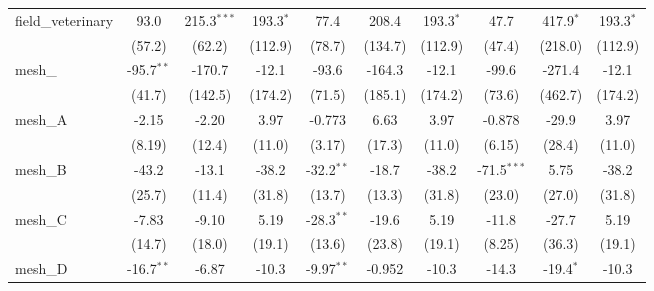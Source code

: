 \begin{tabular}{lccccccccc}
   field\_veterinary                                           & 93.0           & 215.3$^{***}$   & 193.3$^{*}$    & 77.4          & 208.4         & 193.3$^{*}$    & 47.7          & 417.9$^{*}$     & 193.3$^{*}$\\   
                                                               & (57.2)         & (62.2)          & (112.9)        & (78.7)        & (134.7)       & (112.9)        & (47.4)        & (218.0)         & (112.9)\\   
   mesh\_                                                      & -95.7$^{**}$   & -170.7          & -12.1          & -93.6         & -164.3        & -12.1          & -99.6         & -271.4          & -12.1\\   
                                                               & (41.7)         & (142.5)         & (174.2)        & (71.5)        & (185.1)       & (174.2)        & (73.6)        & (462.7)         & (174.2)\\   
   mesh\_A                                                     & -2.15          & -2.20           & 3.97           & -0.773        & 6.63          & 3.97           & -0.878        & -29.9           & 3.97\\   
                                                               & (8.19)         & (12.4)          & (11.0)         & (3.17)        & (17.3)        & (11.0)         & (6.15)        & (28.4)          & (11.0)\\   
   mesh\_B                                                     & -43.2          & -13.1           & -38.2          & -32.2$^{**}$  & -18.7         & -38.2          & -71.5$^{***}$ & 5.75            & -38.2\\   
                                                               & (25.7)         & (11.4)          & (31.8)         & (13.7)        & (13.3)        & (31.8)         & (23.0)        & (27.0)          & (31.8)\\   
   mesh\_C                                                     & -7.83          & -9.10           & 5.19           & -28.3$^{**}$  & -19.6         & 5.19           & -11.8         & -27.7           & 5.19\\   
                                                               & (14.7)         & (18.0)          & (19.1)         & (13.6)        & (23.8)        & (19.1)         & (8.25)        & (36.3)          & (19.1)\\   
   mesh\_D                                                     & -16.7$^{**}$   & -6.87           & -10.3          & -9.97$^{**}$  & -0.952        & -10.3          & -14.3         & -19.4$^{*}$     & -10.3\\   

\end{tabular}
